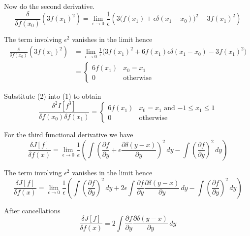 \documentclass[12pt]{article}
\begin{document}
Now do the second derivative.
\begin{equation*}
\frac{\delta}{\delta f(x_0)}\left(3f(x_1)^2\right)
=\lim_{\epsilon\rightarrow0}\frac{1}{\epsilon}
\left(
3\big(f(x_1)+\epsilon\delta(x_1-x_0)\big)^2-3f(x_1)^2
\right)
\end{equation*}

The term involving $\epsilon^2$ vanishes in the limit hence
\begin{align*}
\frac{\delta}{\delta f(x_0)}\left(3f(x_1)^2\right)
&=\lim_{\epsilon\rightarrow0}\frac{1}{\epsilon}
\big(
3f(x_1)^2+6f(x_1)\epsilon\delta(x_1-x_0)-3f(x_1)^2
\big)
\\
&=\begin{cases}
6f(x_1) & x_0=x_1
\\
0 & \text{otherwise}
\end{cases}
\tag{2}
\end{align*}

Substitute (2) into (1) to obtain
\begin{equation*}
\frac{\delta^2 I[f^3]}{\delta f(x_0)\delta f(x_1)}
=\begin{cases}
6f(x_1) & \text{$x_0=x_1$ and $-1\le x_1\le1$}
\\
0 & \text{otherwise}
\end{cases}
\end{equation*}

For the third functional derivative we have
\begin{equation*}
\frac{\delta J[f]}{\delta f(x)}
=\lim_{\epsilon\rightarrow0}\frac{1}{\epsilon}
\left(\int\left(
\frac{\partial f}{\partial y}+\epsilon\frac{\partial\delta(y-x)}{\partial y}
\right)^2\,dy
-\int\left(\frac{\partial f}{\partial y}\right)^2\,dy
\right)
\end{equation*}

The term involving $\epsilon^2$ vanishes in the limit hence
\begin{equation*}
\frac{\delta J[f]}{\delta f(x)}={}
\lim_{\epsilon\rightarrow0}\frac{1}{\epsilon}
\left(
\int\left(\frac{\partial f}{\partial y}\right)^2\,dy
+2\epsilon\int\frac{\partial f}{\partial y}\frac{\partial\delta(y-x)}{\partial y}\,dy
-\int\left(\frac{\partial f}{\partial y}\right)^2\,dy
\right)
\end{equation*}

After cancellations
\begin{equation*}
\frac{\delta J[f]}{\delta f(x)}=2\int\frac{\partial f}{\partial y}\frac{\partial\delta(y-x)}{\partial y}\,dy
\end{equation*}
\end{document}
